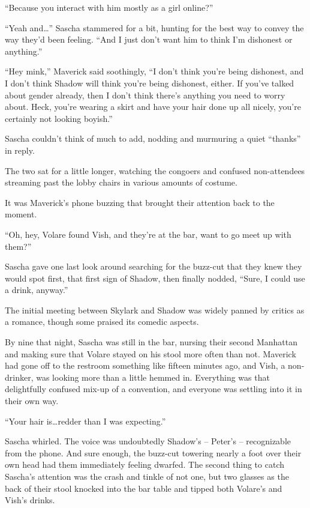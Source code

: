 ``Because you interact with him mostly as a girl online?''

``Yeah and\ldots{}'' Sascha stammered for a bit, hunting for the best way to convey the way they'd been feeling. ``And I just don't want him to think I'm dishonest or anything.''

``Hey mink,'' Maverick said soothingly, ``I don't think you're being dishonest, and I don't think Shadow will think you're being dishonest, either. If you've talked about gender already, then I don't think there's anything you need to worry about. Heck, you're wearing a skirt and have your hair done up all nicely, you're certainly not looking boyish.''

Sascha couldn't think of much to add, nodding and murmuring a quiet ``thanks'' in reply.

The two sat for a little longer, watching the congoers and confused non-attendees streaming past the lobby chairs in various amounts of costume.

It was Maverick's phone buzzing that brought their attention back to the moment.

``Oh, hey, Volare found Vish, and they're at the bar, want to go meet up with them?''

Sascha gave one last look around searching for the buzz-cut that they knew they would spot first, that first sign of Shadow, then finally nodded, ``Sure, I could use a drink, anyway.''

\secdiv{}

The initial meeting between Skylark and Shadow was widely panned by critics as a romance, though some praised its comedic aspects.

By nine that night, Sascha was still in the bar, nursing their second Manhattan and making sure that Volare stayed on his stool more often than not. Maverick had gone off to the restroom something like fifteen minutes ago, and Vish, a non-drinker, was looking more than a little hemmed in. Everything was that delightfully confused mix-up of a convention, and everyone was settling into it in their own way.

``Your hair is\ldots{}redder than I was expecting.''

Sascha whirled. The voice was undoubtedly Shadow's -- Peter's -- recognizable from the phone. And sure enough, the buzz-cut towering nearly a foot over their own head had them immediately feeling dwarfed. The second thing to catch Sascha's attention was the crash and tinkle of not one, but two glasses as the back of their stool knocked into the bar table and tipped both Volare's and Vish's drinks.

